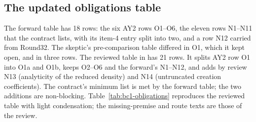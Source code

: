 \subsection{The updated obligations table}
\label{sec:bc1-obligations}
The forward table has 18 rows: the six AY2 rows O1--O6, the eleven rows N1--N11
that the contract lists, with its item-4 entry split into two, and a row N12
carried from Round32. The skeptic's pre-comparison table differed in O1,
which it kept open, and in three rows. The reviewed table in
 has 21 rows. It
splits AY2 row O1 into O1a and O1b, keeps O2--O6 and the forward's N1--N12,
and adds by review N13 (analyticity of the reduced density) and N14
(untruncated creation coefficients). The contract's minimum list is met by
the forward table; the two additions are non-blocking.
Table~\ref{tab:bc1-obligations} reproduces the reviewed table with
light condensation; the missing-premise and route texts are those of the
review.

